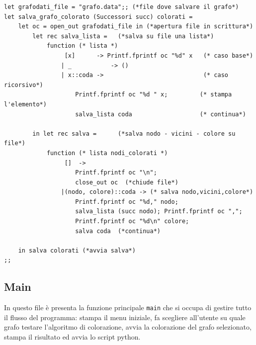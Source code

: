 \begin{lstlisting}[style=camlt, caption={Funzione che salva un grafo su file.}]
let grafodati_file = "grafo.data";; (*file dove salvare il grafo*)
let salva_grafo_colorato (Successori succ) colorati = 
	let oc = open_out grafodati_file in	(*apertura file in scrittura*)
		let rec salva_lista =   (*salva su file una lista*)
			function (* lista *)
				 [x]      -> Printf.fprintf oc "%d" x   (* caso base*)
				| _ 		  -> ()
				| x::coda ->                            (* caso ricorsivo*)            
					Printf.fprintf oc "%d " x;         (* stampa l'elemento*)
					salva_lista coda                   (* continua*)
				
		in let rec salva =      (*salva nodo - vicini - colore su file*)
			function (* lista nodi_colorati *)
				 []  -> 
				 	Printf.fprintf oc "\n"; 
				 	close_out oc  (*chiude file*)
				|(nodo, colore)::coda -> (* salva nodo,vicini,colore*)
					Printf.fprintf oc "%d," nodo; 
					salva_lista (succ nodo); Printf.fprintf oc ","; 
					Printf.fprintf oc "%d\n" colore; 
					salva coda	(*continua*)

	in salva colorati (*avvia salva*)
;;
\end{lstlisting}


\subsection{Main}

In questo file è presenta la funzione principale \lstinline[style=cmd]|main| che si occupa di gestire tutto il flusso del programma: stampa il menu iniziale, fa scegliere all'utente su quale grafo testare l'algoritmo di colorazione, avvia la colorazione del grafo selezionato, stampa il risultato ed avvia lo script python.

